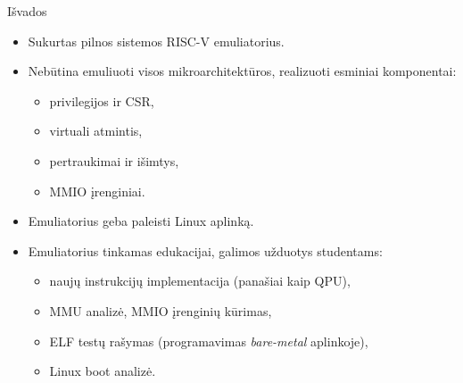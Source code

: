 \documentclass[aspectratio=169]{beamer}
\begin{document}
\begin{frame}{Išvados}
\begin{itemize}
    \item Sukurtas pilnos sistemos RISC-V emuliatorius.
    \item Nebūtina emuliuoti visos mikroarchitektūros, realizuoti esminiai komponentai:
    \begin{itemize}
        \item privilegijos ir CSR,
        \item virtuali atmintis,
        \item pertraukimai ir išimtys,
        \item MMIO įrenginiai.
    \end{itemize}
    \item Emuliatorius geba paleisti Linux aplinką.
    \item Emuliatorius tinkamas edukacijai, galimos užduotys studentams:
    \begin{itemize}
        \item naujų instrukcijų implementacija (panašiai kaip QPU),
        \item MMU analizė, MMIO įrenginių kūrimas,
        \item ELF testų rašymas (programavimas \textit{bare-metal} aplinkoje),
        \item Linux boot analizė.
    \end{itemize}
\end{itemize}
\end{frame}
\end{document}
